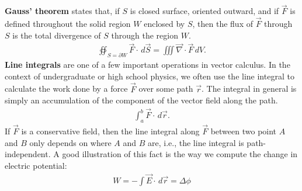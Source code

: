 \documentclass{article}
\theoremstyle{definition}
\begin{document}
\textbf{Gauss' theorem} states that, if $S$ is closed surface, oriented outward, and if $\vec{F}$ is defined throughout the solid region $W$ enclosed by $S$, then the flux of $\vec{F}$ through $S$ is the total divergence of $S$ through the region $W$.
\begin{align*}
\boxed{
\oiint_{S=\partial W}\vec{F}\cdot\,d\vec{S} = \iiint \vec{\nabla}\cdot\vec{F}\,dV.}
\end{align*}
\textbf{Line integrals} are one of a few important operations in vector calculus. In the context of undergraduate or high school physics, we often use the line integral to calculate the work done by a force $\vec{F}$ over some path $\vec{r}$. The integral in general is simply an accumulation of the component of the vector field along the path. 
\begin{align*}
\int_{a}^{b}\vec{F}\cdot\,d\vec{r}.
\end{align*} 
If $\vec{F}$ is a conservative field, then the line integral along $\vec{F}$ between two point $A$ and $B$ only depends on where $A$ and $B$ are, i.e., the line integral is path-independent. A good illustration of this fact is the way we compute the change in electric potential:
\begin{align*}
W = -\int \vec{E}\cdot\,d\vec{r} = \Delta \phi
\end{align*}
\end{document}

